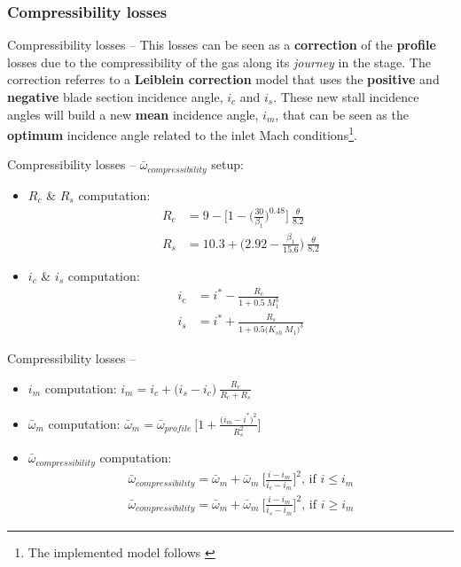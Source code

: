 \subsubsection{Compressibility losses}
	\begin{frame}{Compressibility losses -- }
		 This losses can be seen as a \textbf{correction} of the \textbf{profile} losses due to the compressibility of the gas along its \textit{journey} in the stage. 
		 \newline
		 \newline
		 The correction referres to a \textbf{Leiblein correction} model that uses the \textbf{positive} and \textbf{negative} blade section incidence angle, $i_c$ and $i_s$. 
		 \newline
		 \newline
		 These new stall incidence angles will build a new \textbf{mean} incidence angle, $i_m$, that can be seen as the \textbf{optimum} incidence angle related to the inlet Mach conditions\footnote{The implemented model follows \cite[Ch. 10]{axial2004}}. 
	\end{frame}
	\begin{frame}{Compressibility losses -- }
		$\bar{\omega}_{compressibility}$ setup:
		\begin{itemize}
			\item $R_c$ \& $R_s$ computation:
				\begin{align}
					R_c & = 9 - \Bigg[1 - \Bigg( \frac{30}{\beta_1} \Bigg)^{0.48} \Bigg] \ \frac{\theta}{8.2} \nonumber \\
					R_s & = 10.3 + \Bigg( 2.92 - \frac{\beta_1}{15.6} \Bigg) \ \frac{\theta}{8.2} \nonumber  
				\end{align}
			\item $i_c$ \& $i_s$ computation:
				\begin{align}
					i_c & = i^{*} - \frac{R_c}{1 + 0.5 \ M_{1}^{3}} \nonumber \\
					i_s & = i^{*} + \frac{R_s}{1 + 0.5 \Big( K_{sh} \ M_{1} \Big)^3} \nonumber 
				\end{align}
		\end{itemize}
	\end{frame}
	\begin{frame}{Compressibility losses -- }
		\begin{itemize}
			\item $i_m$ computation: $i_m = i_c + \Big( i_s - i_c \Big) \ \frac{R_c}{R_c + R_s}$
			\item $\bar{\omega}_{m}$ computation: $\bar{\omega}_{m} = \bar{\omega}_{profile} \ \Bigg[ 1 + \frac{\big( i_m - i^{*} \big)^2}{R_s^{2}} \Bigg]$
			\item $\bar{\omega}_{compressibility}$ computation: 
				\begin{align}
					\bar{\omega}_{compressibility} = \bar{\omega}_m + \bar{\omega}_m \ \Bigg[ \frac{i - i_m}{i_c - i_m} \Bigg]^2 \text{, if } i \leq i_m\nonumber \\ 
					\bar{\omega}_{compressibility} = \bar{\omega}_m + \bar{\omega}_m \ \Bigg[ \frac{i - i_m}{i_s - i_m} \Bigg]^2 \text{, if } i \geq i_m \nonumber 
				\end{align}
		\end{itemize}
	\end{frame}
